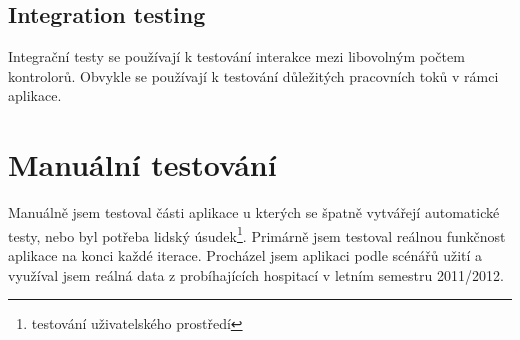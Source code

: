 \subsection{Integration testing}
Integrační testy se používají k testování interakce mezi libovolným počtem kontrolorů. Obvykle se používají k testování důležitých pracovních toků v rámci aplikace.

\section{Manuální testování}
Manuálně jsem testoval části aplikace u kterých se špatně vytvářejí automatické testy, nebo byl potřeba lidský úsudek\footnote{testování uživatelského prostředí}. Primárně jsem testoval reálnou funkčnost aplikace na konci každé iterace. Procházel jsem aplikaci podle scénářů užití a využíval jsem reálná data z probíhajících hospitací v letním semestru 2011/2012.